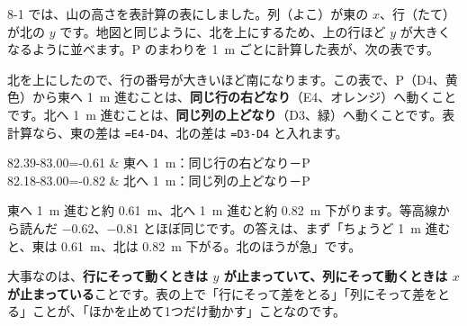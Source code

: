 \leavevmode\label{bk:8-2:hyou}8-1 では、山の高さを表計算の表にしました。列（よこ）が東の $x$、行（たて）が北の $y$ です。地図と同じように、北を上にするため、上の行ほど $y$ が大きくなるように並べます。P のまわりを \qty{1}{m} ごとに計算した表が、次の表です。
\begin{bkcenter}
\par\vspace{1mm}
\end{bkcenter}
北を上にしたので、行の番号が大きいほど南になります。この表で、P（D4、黄色）から東へ \qty{1}{m} 進むことは、\textbf{同じ行の右どなり}（E4、オレンジ）へ動くことです。北へ \qty{1}{m} 進むことは、\textbf{同じ列の上どなり}（D3、緑）へ動くことです。表計算なら、東の差は \texttt{=E4-D4}、北の差は \texttt{=D3-D4} と入れます。
\begin{bkhenkei}[0.46]
82.39-83.00=-0.61 & 東へ \qty{1}{m}：同じ行の右どなり－P \\
82.18-83.00=-0.82 & 北へ \qty{1}{m}：同じ列の上どなり－P \\
\end{bkhenkei}
東へ \qty{1}{m} 進むと約 \qty{0.61}{m}、北へ \qty{1}{m} 進むと約 \qty{0.82}{m} 下がります。等高線から読んだ $-0.62$、$-0.81$ とほぼ同じです。\bkhatenaref の答えは、まず「ちょうど \qty{1}{m} 進むと、東は \qty{0.61}{m}、北は \qty{0.82}{m} 下がる。北のほうが急」です。

\noindent 大事なのは、\textbf{行にそって動くときは $y$ が止まっていて、列にそって動くときは $x$ が止まっている}ことです。表の上で「行にそって差をとる」「列にそって差をとる」ことが、「ほかを止めて1つだけ動かす」ことなのです。

